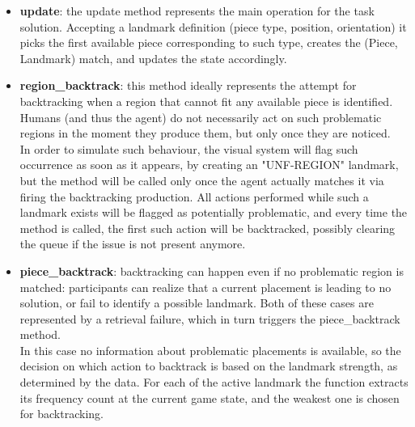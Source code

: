 \documentclass[a4paper,singleside,12pt]{report} %
\begin{document}
    \begin{itemize}
        \item \textbf{update}: the update method represents the main operation for the task
        solution. Accepting a landmark definition (piece type, position, orientation) it picks the
        first available piece corresponding to such type, creates the (Piece, Landmark) match, and
        updates the state accordingly.
        \item \textbf{region\_backtrack}: this method ideally represents the attempt for
        backtracking when a region that cannot fit any available piece is identified. Humans (and
        thus the agent) do not necessarily act on such problematic regions in the moment they
        produce them, but only once they are noticed. \\In order to simulate such behaviour, the
        visual system will flag such occurrence as soon as it appears, by creating an "UNF-REGION"
        landmark, but the method will be called only once the agent actually matches it via firing
        the backtracking production. All actions performed while such a landmark exists will be
        flagged as potentially problematic, and every time the method is called, the first such
        action will be backtracked, possibly clearing the queue if the issue is not present anymore.
        \item \textbf{piece\_backtrack}: backtracking can happen even if no problematic region is
        matched: participants can realize that a current placement is leading to no solution, or
        fail to identify a possible landmark. Both of these cases are represented by a retrieval
        failure, which in turn triggers the piece\_backtrack method. \\In this case no information
        about problematic placements is available, so the decision on which action to backtrack is
        based on the landmark strength, as determined by the data. For each of the active landmark
        the function extracts its frequency count at the current game state, and the weakest one is
        chosen for backtracking.
    \end{itemize}
    
\end{document}
